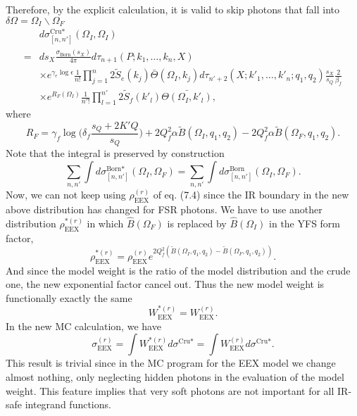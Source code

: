 Therefore, by the explicit calculation, it is valid to skip photons that fall into $\delta\Omega=\Omega_I\backslash\Omega_F$
\begin{align}
&d\sigma^{\text{Cru}\ast}_{[n,n']}(\Omega_I,\Omega_I)\nonumber\\
=&ds_X\frac{\sigma_\text{Born}(s_X)}{4\pi}d\tau_{n+1}(P;k_1,\ldots,k_n,X)\nonumber\\
&\times e^{\gamma_e\log\epsilon}\frac{1}{n!}\prod_{j=1}^{n}2\widetilde{S}_e(k_j)\bar{\Theta}(\Omega_I,k_j)d\tau_{n'+2}(X;k'_1,\ldots,k'_n;q_1,q_2)\frac{s_X}{s_Q}\frac{2}{\beta_f}\nonumber\\
&\times e^{R_F(\Omega_I)}\frac{1}{n'!}\prod_{l=1}^{n'}2\widetilde{S}_f(k'_l)\bar{\Theta(\Omega_I,k'_l)},
\end{align}
where
\begin{equation}
R_F=\gamma_f\log\biggl(\delta_f\frac{s_Q+2K'Q}{s_Q}\biggr)+2Q^2_f\alpha\widetilde{B}(\Omega_I,q_1,q_2)-2Q^2_f\alpha\widetilde{B}(\Omega_F,q_1,q_2).
\end{equation}
Note that the integral is preserved by construction
\begin{equation*}
\sum_{n,n'}\int d\sigma^{\text{Born}\ast}_{[n,n']}(\Omega_I,\Omega_F)=\sum_{n,n'}\int d\sigma^{\text{Born}}_{[n,n']}(\Omega_I,\Omega_F).
\end{equation*}
Now, we can not keep using $\rho^{(r)}_\text{EEX}$ of eq. (7.4) since the IR boundary in the new above distribution has changed for FSR photons. We have to use another distribution $\rho^{\ast(r)}_\text{EEX}$ in which $\widehat{B}(\Omega_F)$ is replaced by $\widehat{B}(\Omega_I)$ in the YFS form factor,
\begin{equation*}
\rho^{\ast(r)}_\text{EEX}=\rho^{(r)}_\text{EEX}e^{2Q^2_f(\widetilde{B}(\Omega_I,q_1,q_2)-\widetilde{B}(\Omega_F,q_1,q_2))}.
\end{equation*}
And since the model weight is the ratio of the model distribution and the crude one, the new exponential factor cancel out. Thus the new model weight is functionally exactly the same
\begin{equation*}
W^{\ast(r)}_\text{EEX}=W^{(r)}_\text{EEX}.
\end{equation*}
In the new MC calculation, we have
\begin{equation}
\sigma_\text{EEX}^{(r)}=\int W^{\ast(r)}_\text{EEX}d\sigma^{\text{Cru}\ast}=\int W^{(r)}_\text{EEX}d\sigma^{\text{Cru}\ast}.
\end{equation}
This result is trivial since in the MC program for the EEX model we change almost nothing, only neglecting hidden photons in the evaluation of the model weight. This feature implies that very soft photons are not important for all IR-safe integrand functions.

